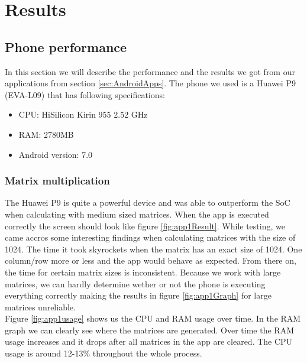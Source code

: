 \documentclass[a4paper, 11pt]{report}
\begin{document}
\chapter{Results}

\section{Phone performance}
In this section we will describe the performance and the results we got from our applications from section \ref{sec:AndroidApps}. The phone we used is a Huawei P9 (EVA-L09) that has following specifications:
\begin{itemize}
	\item{CPU: HiSilicon Kirin 955 2.52 GHz}
	\item{RAM: 2780MB}
	\item{Android version: 7.0}
\end{itemize}

	\subsection{Matrix multiplication}
The Huawei P9 is quite a powerful device and was able to outperform the SoC when calculating with medium sized matrices. When the app is executed correctly the screen should look like figure \ref{fig:app1Result}. While testing, we came accros some interesting findings when calculating matrices with the size of 1024. The time it took skyrockets when the matrix has an exact size of 1024. One column/row more or less and the app would behave as expected. From there on, the time for certain matrix sizes is inconsistent. Because we work with large matrices, we can hardly determine wether or not the phone is executing everything correctly making the results in figure \ref{fig:app1Graph} for large matrices unreliable.\\
Figure \ref{fig:app1usage} shows us the CPU and RAM usage over time. In the RAM graph we can clearly see where the matrices are generated. Over time the RAM usage increases and it drops after all matrices in the app are cleared. The CPU usage is around 12-13\% throughout the whole process.
\end{document}
